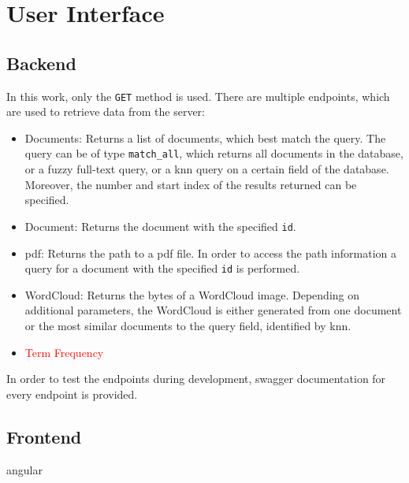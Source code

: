 \section{User Interface}\label{sec:ui}

\subsection{Backend}\label{subsec:backend}

In this work, only the \texttt{GET} method is used.
There are multiple endpoints, which are used to retrieve data from the server:

\begin{itemize}
    \item \label{pt:docs}Documents: 
        Returns a list of documents, which best match the query.
        The query can be of type \texttt{match\_all}, which returns all documents in the database, 
        or a fuzzy full-text query, 
        or a \ac{knn} query on a certain field of the database.
        Moreover, the number and start index of the results returned can be specified.

    \item \label{pt:doc}Document: 
        Returns the document with the specified \texttt{id}.

    \item \label{pt:pdf}\ac{pdf}: 
        Returns the path to a \ac{pdf} file.
        In order to access the path information a query for a document with the specified \texttt{id} is performed.
    
    \item \label{pt:wordcloud}WordCloud: 
        Returns the bytes of a WordCloud image. 
        Depending on additional parameters, the WordCloud is either generated from one document or 
        the most similar documents to the query field, identified by \ac{knn}.

    \item \label{pt:termfrequency}\textcolor{red}{Term Frequency}
\end{itemize}

In order to test the endpoints during development, swagger documentation for every endpoint is provided.





\subsection{Frontend}\label{subsec:frontend}
angular